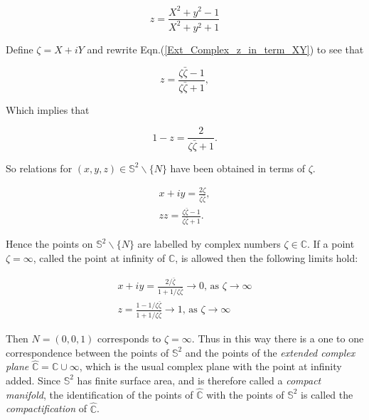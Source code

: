 \begin{equation}\label{Ext_Complex_z_in_term_XY} 
z = \frac{X^2 + y^2 - 1}{X^2 + y^2 + 1}
\end{equation}

Define $\zeta = X+ iY$ and rewrite Eqn.(\ref{Ext_Complex_z_in_term_XY}) to see that


\begin{equation*}
z = \frac{\zeta\bar{\zeta} - 1}{\zeta\bar{\zeta} + 1},
\end{equation*}

\noindent Which implies that

\begin{equation*}
1- z = \frac{2}{\zeta\bar{\zeta} + 1}.
\end{equation*}

\noindent So relations for $(x,y,z) \in \mathbb{S}^2 \backslash \{N\}$ have been obtained in terms of $\zeta$.

\begin{eqnarray}\label{Ext_Complex_xy_interms_zeta}
x + iy = \frac{2\zeta}{\zeta\bar{\zeta}}, \\\label{Ext_Complex_z_interms_zeta}
z z = \frac{\zeta\bar{\zeta} - 1}{\zeta\bar{\zeta} + 1}.
\end{eqnarray}

\noindent Hence the points on $\mathbb{S}^2 \backslash \{N\}$ are labelled by complex numbers $\zeta \in \mathbb{C}$. If a point $\zeta = \infty$, called the point at infinity of $\mathbb{C}$, is allowed then the following limits hold:

\begin{eqnarray*}
x+ iy = \frac{2/\bar{\zeta}}{1 + 1/\zeta\bar{\zeta}} \rightarrow 0 \text{, as  } \zeta \rightarrow \infty \\
z = \frac{1- 1/\zeta\bar{\zeta}}{1+ 1/\zeta\bar{\zeta}} \rightarrow 1 \text{, as  } \zeta \rightarrow \infty 
\end{eqnarray*}

\noindent Then $N = (0,0,1)$ corresponds to $\zeta = \infty$. Thus in this way there is a one to one correspondence between the points of $\mathbb{S}^2$ and the points of the \textit{extended complex plane} $\hat{\mathbb{C}} = \mathbb{C} \cup {\infty}$, which is the usual complex plane with the point at infinity added. Since $\mathbb{S}^2$ has finite surface area, and is therefore called a \textit{compact manifold}, the identification of the points of $\hat{\mathbb{C}}$ with the points of $\mathbb{S}^2$ is called the \textit{compactification} of $\hat{\mathbb{C}}$.

